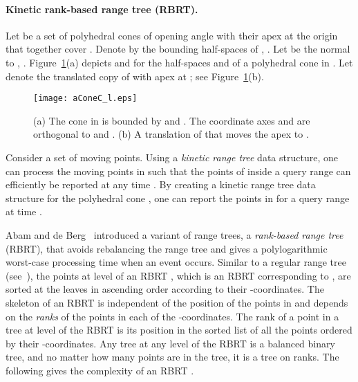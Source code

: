 \documentclass[preprint,12pt]{elsarticle}
\begin{document}
\paragraph{Kinetic rank-based range tree (RBRT).} Let  be a set of polyhedral cones of opening angle  with their apex at the origin  that together cover . Denote by  the bounding half-spaces  of , . Let  be the normal to , . Figure~\ref{fig:aConeC_l}(a) depicts  and  for the half-spaces  and  of a polyhedral cone  in . Let  denote the translated copy of  with apex at ; see Figure~\ref{fig:aConeC_l}(b). 

\begin{figure}[t!]
\begin{center}
\texttt{[image: aConeC\_l.eps]}
\end{center}
\caption{(a) The cone  in  is bounded by  and . The coordinate axes  and  are orthogonal to  and . (b) A translation of  that moves the apex to .}
\label{fig:aConeC_l}
\end{figure}

Consider a set  of moving points. Using a \textit{kinetic range tree} data structure, one can process the moving points in  such that the points of  inside a query range can efficiently be reported at any time . By creating a kinetic range tree data structure  for the polyhedral cone , one can report the points in  for a query range  at time . 

Abam and de Berg~\cite{Abam:2011:KSX:1971362.1971367} introduced a variant of range trees, a \textit{rank-based range tree} (RBRT), that avoids rebalancing the range tree and gives a polylogarithmic worst-case processing time when an event occurs. Similar to a regular range tree (see~\cite{Berg:2008:CGA:1370949}), the points at level  of an RBRT , which is an RBRT corresponding to , are sorted at the leaves in ascending order according to their -coordinates. The skeleton of an RBRT  is independent of the position of the points in  and depends on the \textit{ranks} of the points in each of the -coordinates. The rank of a point in a tree at level  of the RBRT  is its position in the sorted list of all the points ordered by their -coordinates. Any tree at any level of the RBRT  is a balanced binary tree, and no matter how many points are in the tree, it is a tree on  ranks. The following gives the complexity of an RBRT .
\end{document}
